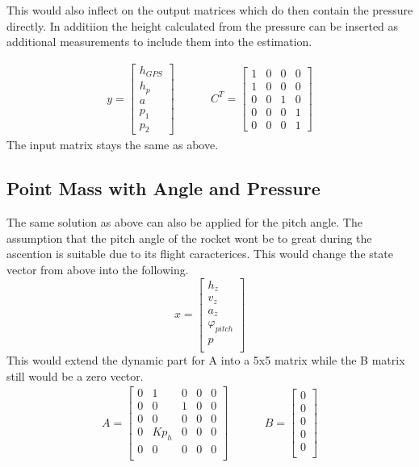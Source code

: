   This would also inflect on the output matrices which do then contain the pressure directly.
  In additiion the height calculated from the pressure can be inserted as additional measurements to include them into the estimation.
  
  \begin{align*}
   y = \begin{bmatrix}
        h_{GPS}	\\
        h_{p}	\\
        a	\\
        p_1	\\
        p_2	
       \end{bmatrix}
       & \hspace{1cm}
  C^T = \begin{bmatrix}
       1 & 0 & 0 & 0 \\
       1 & 0 & 0 & 0 \\
       0 & 0 & 1 & 0 \\
       0 & 0 & 0 & 1 \\
       0 & 0 & 0 & 1 
      \end{bmatrix}
  \end{align*}
  The input matrix stays the same as above.

  \subsection{Point Mass with Angle and Pressure}
  The same solution as above can also be applied for the pitch angle. 
  The assumption that the pitch angle of the rocket wont be to great during the ascention is suitable due to its flight caracterices.
  This would change the state vector from above into the following.
  $$ x = \begin{bmatrix}
  h_z\\
  v_z\\
  a_z\\
  \varphi_{pitch}\\
  p\\
  \end{bmatrix} $$
  This would extend the dynamic part for A into a 5x5 matrix while the B matrix still would be a zero vector.
  \begin{align*}
  A= \begin{bmatrix}
        0 & 1 & 0 & 0 & 0 \\
        0 & 0 & 1 & 0 & 0 \\
        0 & 0 & 0 & 0 & 0 \\
        0 & Kp_h & 0 & 0 & 0 \\
        0 & 0 & 0 & 0 & 0 \\
        \end{bmatrix}
  & \hspace{1cm}
  B = \begin{bmatrix}
             0 \\
             0 \\
             0 \\
             0 \\
             0 \\
        \end{bmatrix}
  \end{align*}
  
